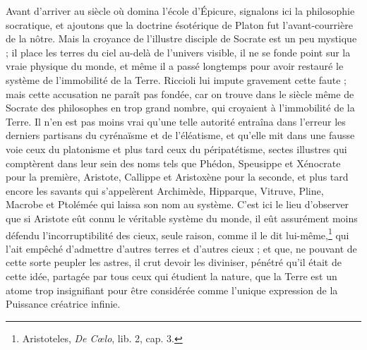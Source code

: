 \documentclass[a4paper, 11pt, oneside]{article}
\begin{document}
Avant d'arriver au siècle où domina l'école d'Épicure, signalons ici la philosophie socratique, et ajoutons que la doctrine ésotérique de Platon fut l'avant-courrière de la nôtre. Mais la croyance de l'illustre disciple de Socrate est un peu mystique ; il place les terres du ciel au-delà de l'univers visible, il ne se fonde point sur la vraie physique du monde, et même il a passé longtemps pour avoir restauré le système de l'immobilité de la Terre. Riccioli lui impute gravement cette faute ; mais cette accusation ne paraît pas fondée, car on trouve dans le siècle même de Socrate des philosophes en trop grand nombre, qui croyaient à l'immobilité de la Terre. Il n'en est pas moins vrai qu'une telle autorité entraîna dans l'erreur les derniers partisans du cyrénaïsme et de l'éléatisme, et qu'elle mit dans une fausse voie ceux du platonisme et plus tard ceux du péripatétisme, sectes illustres qui comptèrent dans leur sein des noms tels que Phédon, Speusippe et Xénocrate pour la première, Aristote, Callippe et Aristoxène pour la seconde, et plus tard encore les savants qui s'appelèrent Archimède, Hipparque, Vitruve, Pline, Macrobe et Ptolémée qui laissa son nom au système. C'est ici le lieu d'observer que si Aristote eût connu le véritable système du monde, il eût assurément moins défendu l'incorruptibilité des cieux, seule raison, comme il le dit lui-même,\footnote{Aristoteles, \emph{De Cœlo}, lib. 2, cap. 3.} qui l'ait empêché d'admettre d'autres terres et d'autres cieux ; et que, ne pouvant de cette sorte peupler les astres, il crut devoir les diviniser, pénétré qu'il était de cette idée, partagée par tous ceux qui étudient la nature, que la Terre est un atome trop insignifiant pour être considérée comme l'unique expression de la Puissance créatrice infinie.
\end{document}
